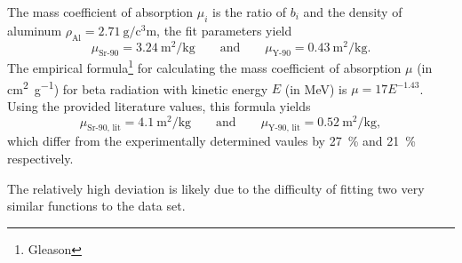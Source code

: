 The mass coefficient of absorption $\mu_i$ is the ratio of $b_i$ and the density of aluminum $\rho_\text{Al} = \SI{2.71}{\gram\per\cubic\centi\meter}$, the fit parameters yield
\begin{equation*}
	\mu_\text{Sr-90} = \SI{3.24}{\meter\squared\per\kilo\gram} \qquad \text{and} \qquad \mu_\text{Y-90} = \SI{0.43}{\meter\squared\per\kilo\gram}.
\end{equation*}
The empirical formula\footnote{Gleason} for calculating the mass coefficient of absorption $\mu$ (in \si{\centi\meter\squared\per\gram}) for beta radiation with kinetic energy $E$ (in \si{\MeV}) is $\mu = 17 E^{-1.43}$.
Using the provided literature values, this formula yields
\begin{equation*}
	\mu_\text{Sr-90, lit} = \SI{4.1}{\meter\squared\per\kilo\gram} \qquad \text{and} \qquad \mu_\text{Y-90, lit} = \SI{0.52}{\meter\squared\per\kilo\gram},
\end{equation*}
which differ from the experimentally determined vaules by \SI{27}{\percent} and \SI{21}{\percent} respectively.

The relatively high deviation is likely due to the difficulty of fitting two very similar functions to the data set.

